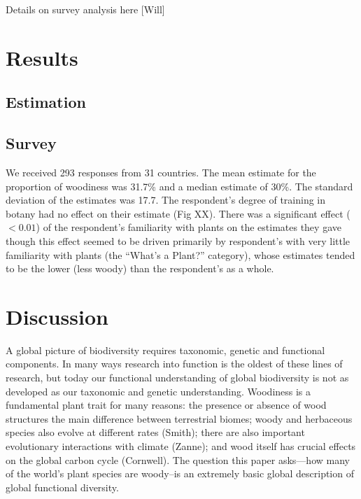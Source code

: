 \documentclass[12pt]{article}
\begin{document}
Details on survey analysis here [Will]


\section{Results}

\subsection{Estimation}

\subsection{Survey}

We received 293 responses from 31 countries. The mean estimate for the proportion of woodiness was 31.7\% and a median estimate of 30\%. The standard deviation of the estimates was 17.7. The respondent's degree of training in botany had no effect on their estimate (Fig XX). There was a significant effect ($<0.01$) of the respondent's  familiarity with plants on the estimates they gave though this effect seemed to be driven primarily by respondent's with very little familiarity with plants (the ``What's a Plant?'' category), whose estimates tended to be the lower (less woody) than the respondent's as a whole.

\section{Discussion}

A global picture of biodiversity requires taxonomic, genetic and functional components.  In many ways research into function is the oldest of these lines of research, but today our functional understanding of global biodiversity is not as developed as our taxonomic and genetic understanding. Woodiness is a fundamental plant trait for many reasons: the presence or absence of wood  structures the main difference between terrestrial biomes; woody and herbaceous species also evolve at different rates (Smith);  there are also important evolutionary interactions with climate (Zanne); and wood itself has crucial effects on the global carbon cycle (Cornwell).  The question this paper asks---how many of the world's plant species are woody--is an extremely basic global description of global functional diversity.  





\end{document}
